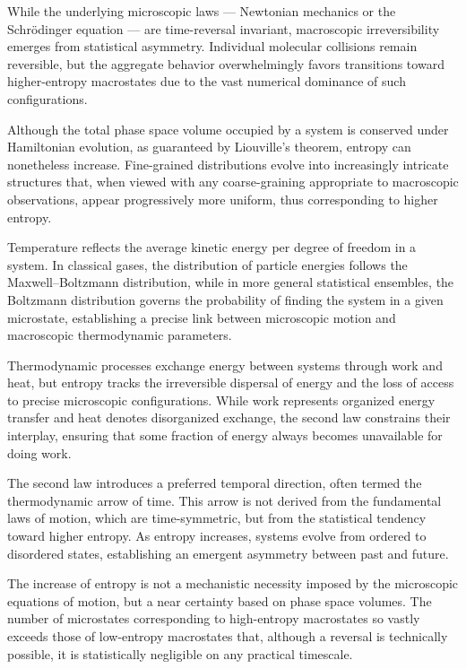 While the underlying microscopic laws — Newtonian mechanics or the Schrödinger equation — are time-reversal invariant, macroscopic irreversibility emerges from statistical asymmetry. Individual molecular collisions remain reversible, but the aggregate behavior overwhelmingly favors transitions toward higher-entropy macrostates due to the vast numerical dominance of such configurations.

Although the total phase space volume occupied by a system is conserved under Hamiltonian evolution, as guaranteed by Liouville’s theorem, entropy can nonetheless increase. Fine-grained distributions evolve into increasingly intricate structures that, when viewed with any coarse-graining appropriate to macroscopic observations, appear progressively more uniform, thus corresponding to higher entropy.

Temperature reflects the average kinetic energy per degree of freedom in a system. In classical gases, the distribution of particle energies follows the Maxwell–Boltzmann distribution, while in more general statistical ensembles, the Boltzmann distribution governs the probability of finding the system in a given microstate, establishing a precise link between microscopic motion and macroscopic thermodynamic parameters.

Thermodynamic processes exchange energy between systems through work and heat, but entropy tracks the irreversible dispersal of energy and the loss of access to precise microscopic configurations. While work represents organized energy transfer and heat denotes disorganized exchange, the second law constrains their interplay, ensuring that some fraction of energy always becomes unavailable for doing work.

The second law introduces a preferred temporal direction, often termed the thermodynamic arrow of time. This arrow is not derived from the fundamental laws of motion, which are time-symmetric, but from the statistical tendency toward higher entropy. As entropy increases, systems evolve from ordered to disordered states, establishing an emergent asymmetry between past and future.

The increase of entropy is not a mechanistic necessity imposed by the microscopic equations of motion, but a near certainty based on phase space volumes. The number of microstates corresponding to high-entropy macrostates so vastly exceeds those of low-entropy macrostates that, although a reversal is technically possible, it is statistically negligible on any practical timescale.

